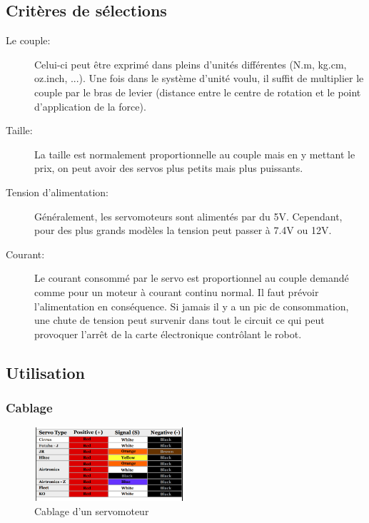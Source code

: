 \documentclass[a4paper, 11pt]{report}
\begin{document}
\subsection{Critères de sélections}
\begin{description}
\item[Le couple:]Celui-ci peut être exprimé dans pleins d'unités différentes (N.m, kg.cm, oz.inch, ...). Une fois dans le système d'unité voulu, il suffit de multiplier le couple par le bras de levier (distance entre le centre de rotation et le point d'application de la force).
\item[Taille:]La taille est normalement proportionnelle au couple mais en y mettant le prix, on peut avoir des servos plus petits mais plus puissants.
\item[Tension d'alimentation:]Généralement, les servomoteurs sont alimentés par du 5V. Cependant, pour des plus grands modèles la tension peut passer à 7.4V ou 12V.
\item[Courant:]Le courant consommé par le servo est proportionnel au couple demandé comme pour un moteur à courant continu normal. Il faut prévoir l'alimentation en conséquence. Si jamais il y a un pic de consommation, une chute de tension peut survenir dans tout le circuit ce qui peut provoquer l'arrêt de la carte électronique contrôlant le robot.
\end{description}


\subsection{Utilisation}

\subsubsection{Cablage}

\begin{figure}[h!]
\begin{centering}
\includegraphics[width=0.5\textwidth]{images/colorCodeCableServo.png}
\caption{Cablage d'un servomoteur}
\par\end{centering}
\end{figure}
\end{document}
